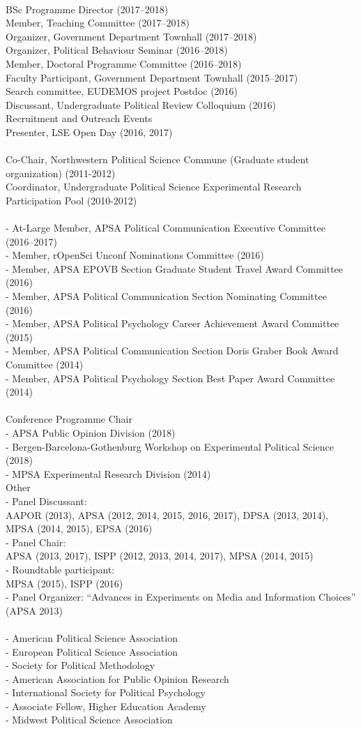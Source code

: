 \documentclass[12pt]{article}
\newcommand{\topic}[1]{\pagebreak[3]\indent {\color{lg}{\footnotesize #1 }}\\}
\newcommand{\entry}[1]{\indent {\color{lg}\guillemotright}\hspace{2pt}#1\vspace{.25em}\\}
\newcommand{\subentry}[1]{{\color{lg}-} #1\vspace{.25em}\\}
\begin{document}
{\topic{Departmental (London School of Economics and Political Science)}
	\entry{BSc Programme Director (2017--2018)}
    \entry{Member, Teaching Committee (2017--2018)}
    \entry{Organizer, Government Department Townhall (2017--2018)}
    \entry{Organizer, Political Behaviour Seminar (2016--2018)}
	\entry{Member, Doctoral Programme Committee (2016--2018)}
    \entry{Faculty Participant, Government Department Townhall (2015--2017)}
	\entry{Search committee, EUDEMOS project Postdoc (2016)}
	\entry{Discussant, Undergraduate Political Review Colloquium (2016)}
    \entry{Recruitment and Outreach Events}
        \entry{Presenter, LSE Open Day (2016, 2017)}

\topic{Departmental (Northwestern University)}
	\entry{Co-Chair, Northwestern Political Science Commune (Graduate student organization) (2011-2012)}
	\entry{Coordinator, Undergraduate Political Science Experimental Research Participation Pool (2010-2012)}

\topic{Disciplinary Committees}
		\subentry{At-Large Member, APSA Political Communication Executive Committee (2016--2017)}
		\subentry{Member, rOpenSci Unconf Nominations Committee (2016)}
		\subentry{Member, APSA EPOVB Section Graduate Student Travel Award Committee (2016)}
		\subentry{Member, APSA Political Communication Section Nominating Committee (2016)}
		\subentry{Member, APSA Political Psychology Career Achievement Award Committee (2015)}
		\subentry{Member, APSA Political Communication Section Doris Graber Book Award Committee (2014)}
		\subentry{Member, APSA Political Psychology Section Best Paper Award Committee (2014)}

\topic{Service at Professional Conferences}
    \entry{Conference Programme Chair}
        \subentry{APSA Public Opinion Division (2018)}
        \subentry{Bergen-Barcelona-Gothenburg Workshop on Experimental Political Science (2018)}
        \subentry{MPSA Experimental Research Division (2014)}
	\entry{Other}
        \subentry{Panel Discussant:\\ AAPOR (2013), APSA (2012, 2014, 2015, 2016, 2017), DPSA (2013, 2014), MPSA (2014, 2015), EPSA (2016)}
		\subentry{Panel Chair:\\ APSA (2013, 2017), ISPP (2012, 2013, 2014, 2017), MPSA (2014, 2015)}
		\subentry{Roundtable participant:\\ MPSA (2015), ISPP (2016)}
		\subentry{Panel Organizer: ``Advances in Experiments on Media and Information Choices'' (APSA 2013)}

\topic{Current and Former Professional Memberships:}
		\subentry{American Political Science Association}
		\subentry{European Political Science Association}
        \subentry{Society for Political Methodology}
		\subentry{American Association for Public Opinion Research}
		\subentry{International Society for Political Psychology}
		\subentry{Associate Fellow, Higher Education Academy}
        \subentry{Midwest Political Science Association}
		
}
\end{document}
